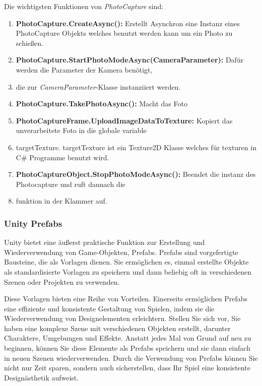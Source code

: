 Die wichtigsten Funktionen von \textit{PhotoCapture} sind:


\begin{enumerate}
    \item \textbf{PhotoCapture.CreateAsync():} Erstellt Asynchron eine Instanz eines PhotoCapture Objekts welches
    benutzt werden kann um ein Photo zu schießen.
    \item \textbf{PhotoCapture.StartPhotoModeAsync(CameraParameter):} Dafür werden die Parameter der Kamera benötigt,
    \item die zur \textit{CameraParameter}-Klasse instanziiert werden.
    \item \textbf{PhotoCapture.TakePhotoAsync():} Macht das Foto
    \item \textbf{PhotoCaptureFrame.UploadImageDataToTexture:} Kopiert das unverarbeitete Foto in die globale variable
    \item targetTexture. targetTexture ist ein Texture2D Klasse welches für texturen in C\# Programme benutzt wird.
    \item \textbf{PhotoCaptureObject.StopPhotoModeAsync():} Beendet die instanz des Photocapture und ruft dannach die
    \item funktion in der Klammer auf.
\end{enumerate}

\subsubsection{Unity Prefabs} 
Unity bietet eine äußerst praktische Funktion zur Erstellung und Wiederverwendung von Game-Objekten, Prefabs. Prefabs sind
vorgefertigte Bausteine, die als Vorlagen dienen. Sie ermöglichen es, einmal erstellte Objekte als standardisierte Vorlagen
zu speichern und dann beliebig oft in verschiedenen Szenen oder Projekten zu verwenden.

Diese Vorlagen bieten eine Reihe von Vorteilen. Einerseits ermöglichen Prefabs eine effiziente und konsistente Gestaltung
von Spielen, indem sie die Wiederverwendung von Designelementen erleichtern. Stellen Sie sich vor, Sie haben eine komplexe
Szene mit verschiedenen Objekten erstellt, darunter Charaktere, Umgebungen und Effekte. Anstatt jedes Mal von Grund auf
neu zu beginnen, können Sie diese Elemente als Prefabs speichern und sie dann einfach in neuen Szenen wiederverwenden.
Durch die Verwendung von Prefabs können Sie nicht nur Zeit sparen, sondern auch sicherstellen, dass Ihr Spiel eine
konsistente Designästhetik aufweist.

